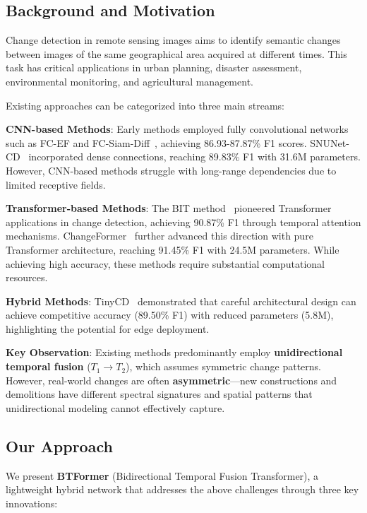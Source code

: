 \documentclass[journal]{IEEEtran}
\begin{document}
\subsection{Background and Motivation}

Change detection in remote sensing images aims to identify semantic changes between images of the same geographical area acquired at different times. This task has critical applications in urban planning, disaster assessment, environmental monitoring, and agricultural management.

Existing approaches can be categorized into three main streams:

\textbf{CNN-based Methods}: Early methods employed fully convolutional networks such as FC-EF and FC-Siam-Diff~\cite{daudt2018fully}, achieving 86.93-87.87\% F1 scores. SNUNet-CD~\cite{chen2021snunet} incorporated dense connections, reaching 89.83\% F1 with 31.6M parameters. However, CNN-based methods struggle with long-range dependencies due to limited receptive fields.

\textbf{Transformer-based Methods}: The BIT method~\cite{chen2021remote} pioneered Transformer applications in change detection, achieving 90.87\% F1 through temporal attention mechanisms. ChangeFormer~\cite{bandara2022transformer} further advanced this direction with pure Transformer architecture, reaching 91.45\% F1 with 24.5M parameters. While achieving high accuracy, these methods require substantial computational resources.

\textbf{Hybrid Methods}: TinyCD~\cite{codegoni2023tinycd} demonstrated that careful architectural design can achieve competitive accuracy (89.50\% F1) with reduced parameters (5.8M), highlighting the potential for edge deployment.

\textbf{Key Observation}: Existing methods predominantly employ \textbf{unidirectional temporal fusion} ($T_1 \rightarrow T_2$), which assumes symmetric change patterns. However, real-world changes are often \textbf{asymmetric}—new constructions and demolitions have different spectral signatures and spatial patterns that unidirectional modeling cannot effectively capture.

\subsection{Our Approach}

We present \textbf{BTFormer} (Bidirectional Temporal Fusion Transformer), a lightweight hybrid network that addresses the above challenges through three key innovations:
\end{document}
